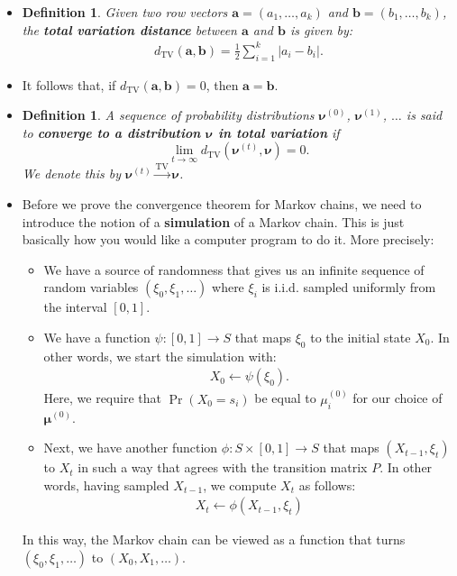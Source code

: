 \documentclass[10pt]{article}
\newtheorem{definition}[lemma]{Definition}
\newcommand{\ve}[1]{\mathbf{#1}}
\newcommand{\mrm}[1]{\mathrm{#1}}
\newcommand{\ves}[1]{\boldsymbol{#1}}
\begin{document}
\begin{itemize}
  \item \begin{definition} \label{definition:finite-total-variation-distance}
    Given two row vectors $\ve{a} = (a_1, \dotsc, a_k)$ and $\ve{b} = (b_1, \dotsc, b_k)$, the {\bf total variation distance} between $\ve{a}$ and $\ve{b}$ is given by:
    \begin{align*}
        d_{\mrm{TV}}(\ve{a},\ve{b}) = \frac{1}{2} \sum_{i=1}^k | a_i - b_i |.
    \end{align*}
  \end{definition}

  \item It follows that, if $d_{\mrm{TV}}(\ve{a}, \ve{b}) = 0$, then $\ve{a} = \ve{b}$.
  
  \item \begin{definition}
    A sequence of probability distributions $\ves{\nu}^{(0)}$, $\ves{\nu}^{(1)}$, $\dotsc$ is said to {\bf converge to a distribution $\ves{\nu}$ in total variation} if $$\lim_{t \rightarrow \infty} d_{\mrm{TV}}(\ves{\nu}^{(t)}, \ves{\nu}) = 0.$$ We denote this by $\ves{\nu}^{(t)} \xrightarrow{\mrm{TV}} \ves{\nu}$.
  \end{definition}

  \item Before we prove the convergence theorem for Markov chains, we need to introduce the notion of a {\bf simulation} of a Markov chain. This is just basically how you would like a computer program to do it. More precisely:
  \begin{itemize}
    \item We have a source of randomness that gives us an infinite sequence of random variables $(\xi_0, \xi_1, \dotsc)$ where $\xi_i$ is i.i.d. sampled uniformly from the interval $[0,1]$.
    
    \item We have a function $\psi: [0,1] \rightarrow S$ that maps $\xi_0$ to the initial state $X_0$. In other words, we start the simulation with:
    \begin{align*}
        X_0 \gets \psi(\xi_0).
    \end{align*}
    Here, we require that $\Pr(X_0 = s_i)$ be equal to $\mu_i^{(0)}$ for our choice of $\ves{\mu}^{(0)}$.

    \item Next, we have another function $\phi: S \times [0,1] \rightarrow S$ that maps $(X_{t-1}, \xi_t)$ to $X_t$ in such a way that agrees with the transition matrix $P$. In other words, having sampled $X_{t-1}$, we compute $X_t$ as follows:
    \begin{align*}
        X_{t} \gets \phi(X_{t-1}, \xi_t)
    \end{align*}
  \end{itemize}
  In this way, the Markov chain can be viewed as a function that turns $(\xi_0, \xi_1, \dotsc)$ to $(X_0, X_1, \dotsc)$.


\end{itemize}
\end{document}
